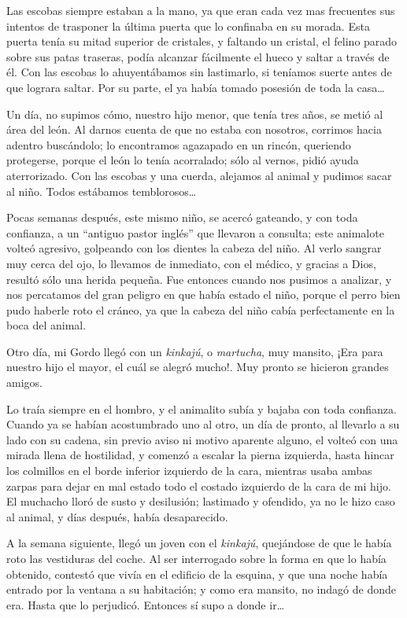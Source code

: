 \documentclass[letterpaper, 12pt]{book}
\begin{document}
Las escobas siempre estaban a la mano, ya que eran cada vez mas frecuentes sus intentos de trasponer la última puerta que lo confinaba en su morada. Esta puerta tenía su mitad superior de cristales, y faltando un cristal, el felino parado sobre sus patas traseras, podía alcanzar fácilmente el hueco y saltar a través de él. Con las escobas lo ahuyentábamos sin lastimarlo, si teníamos suerte antes de que lograra saltar. Por su parte, el ya había tomado posesión de toda la casa\ldots

Un día, no supimos cómo, nuestro hijo menor, que tenía tres años, se metió al área del león. Al darnos cuenta de que no estaba con nosotros, corrimos hacia adentro buscándolo; lo encontramos agazapado en un rincón, queriendo protegerse, porque el león lo tenía acorralado; sólo al vernos, pidió ayuda aterrorizado. Con las escobas y una cuerda, alejamos al animal y pudimos sacar al niño. Todos estábamos temblorosos\ldots

Pocas semanas después, este mismo niño, se acercó gateando, y con toda confianza, a un ``antiguo pastor inglés'' que llevaron a consulta; este animalote volteó agresivo, golpeando con los dientes la cabeza del niño. Al verlo sangrar muy cerca del ojo, lo llevamos de inmediato, con el médico, y gracias a Dios, resultó sólo una herida pequeña. Fue entonces cuando nos pusimos a analizar, y nos percatamos del gran peligro en que había estado el niño, porque el perro bien pudo haberle roto el cráneo, ya que la cabeza del niño cabía perfectamente en la boca del animal.

Otro día, mi Gordo llegó con un \textit{kinkajú}, o \textit{martucha}, muy mansito, ¡Era para nuestro hijo el mayor, el cuál se alegró mucho!. Muy pronto se hicieron grandes amigos.

Lo traía siempre en el hombro, y el animalito subía y bajaba con toda confianza. Cuando ya se habían acostumbrado uno al otro, un día de pronto, al llevarlo a su lado con su cadena, sin previo aviso ni motivo aparente alguno, el volteó con una mirada llena de hostilidad, y comenzó a escalar la pierna izquierda, hasta hincar los colmillos en el borde inferior izquierdo de la cara, mientras usaba ambas zarpas para dejar en mal estado todo el costado izquierdo de la cara de mi hijo. El muchacho lloró de susto y desilusión; lastimado y ofendido, ya no le hizo caso al animal, y días después, había desaparecido.

A la semana siguiente, llegó un joven con el \textit{kinkajú}, quejándose de que le había roto las vestiduras del coche. Al ser interrogado sobre la forma en que lo había obtenido, contestó que vivía en el edificio de la esquina, y que una noche había entrado por la ventana a su habitación; y como era mansito, no indagó de donde era. Hasta que lo perjudicó. Entonces sí supo a donde ir\ldots
\end{document}
